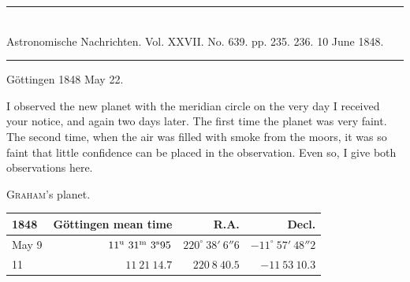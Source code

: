 \clearpage
{}
\begin{center}
\rule{0.55\linewidth}{0.4pt}\\[2pt]
Astronomische Nachrichten. Vol. XXVII. No. 639. pp. 235. 236. 10 June 1848.\\[2pt]
\rule{0.55\linewidth}{0.4pt}
\end{center}
\begin{flushright}Göttingen 1848 May\raisebox{.35ex}{,} 22.\end{flushright}

I observed the new planet with the meridian circle on the very day I received your notice, and again two days later. The first time the planet was very faint. The second time, when the air was filled with smoke from the moors, it was so faint that little confidence can be placed in the observation. Even so, I give both observations here.

\begin{center}
\textsc{Graham}’s planet.\\[3pt]
\setlength{\tabcolsep}{4pt}
\begin{tabular}{l|r|r|r}
1848 & Göttingen mean time & R.A. & Decl. \\\hline
May 9 & $11^{\rm u}\ 31^{\rm m}\ 3^{\rm s}95$ & $220^\circ\ 38'\ 6''6$ & $-11^\circ\ 57'\ 48''2$ \\
\hfill 11 & $11\ 21\ 14.7$ & $220\ 8\ 40.5$ & $-11\ 53\ 10.3$ \\
\end{tabular}
\end{center}

